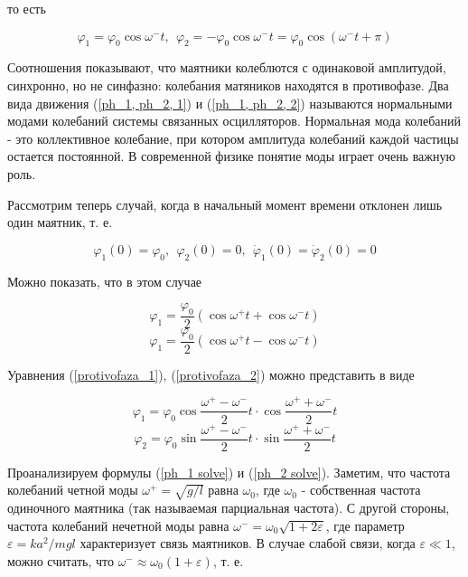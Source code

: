 \documentclass[14pt]{article}
\begin{document}
\noindent то есть

\begin{equation}\label{ph_1, ph_2, 2}
\varphi_1 = \varphi_0\cos\omega^-t, ~~\varphi_2 = -\varphi_0\cos\omega^-t = \varphi_0\cos(\omega^-t + \pi)
\end{equation}

Соотношения показывают, что маятники колеблются с одинаковой амплитудой, синхронно, но не синфазно: колебания матяников находятся в противофазе. Два вида движения (\ref{ph_1, ph_2, 1}) и (\ref{ph_1, ph_2, 2}) называются нормальными модами колебаний системы связанных осцилляторов. Нормальная мода колебаний - это коллективное колебание, при котором амплитуда колебаний каждой частицы остается постоянной. В современной физике понятие моды играет очень важную роль.

Рассмотрим теперь случай, когда в начальный момент времени отклонен лишь один маятник, т. е.

$$\varphi_1(0) = \varphi_0, ~~\varphi_2(0) = 0, ~~\dot \varphi_1(0) = \dot \varphi_2(0) = 0$$



Можно показать, что в этом случае 

\begin{equation}\label{protivofaza_1}
\varphi_1 = \frac{\varphi_0}{2}(\cos\omega^+t + \cos\omega^-t)
\end{equation}
\begin{equation}\label{protivofaza_2}
\varphi_1 = \frac{\varphi_0}{2}(\cos\omega^+t - \cos\omega^-t)
\end{equation}

\noindent Уравнения (\ref{protivofaza_1}), (\ref{protivofaza_2}) можно представить в виде

\begin{equation}\label{ph_1 solve}
\varphi_1 = \varphi_0\cos\frac{\omega^+ - \omega^-}{2}t \cdot \cos\frac{\omega^+ + \omega^-}{2}t
\end{equation}
\begin{equation}\label{ph_2 solve}
\varphi_2 = \varphi_0\sin\frac{\omega^+ - \omega^-}{2}t \cdot \sin\frac{\omega^+ + \omega^-}{2}t
\end{equation}

Проанализируем формулы (\ref{ph_1 solve}) и (\ref{ph_2 solve}). Заметим, что частота колебаний четной моды $\omega^+ = \sqrt{g/l}$ равна 
$\omega_0$, где $\omega_0$ - собственная частота одиночного маятника (так называемая парциальная частота). С другой стороны, частота колебаний нечетной моды равна $\omega^- = \omega_0\sqrt{1 + 2\varepsilon	}$, где параметр $\varepsilon = ka^2/mgl$ характеризует связь маятников. В случае слабой связи, когда $\varepsilon \ll 1$, можно считать, что $\omega^- \approx \omega_0(1 + \varepsilon)$, т. е.
\end{document}
